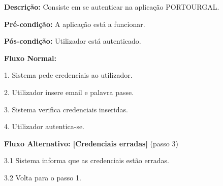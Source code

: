 \textbf{Descrição:}  Consiste em se autenticar na aplicação PORTOURGAL.

\textbf{Pré-condição:} A aplicação está a funcionar.

\textbf{Pós-condição:} Utilizador está autenticado.

\textbf{Fluxo Normal:}

1. Sistema pede credenciais ao utilizador.

2. Utilizador insere email e palavra passe.

3. Sistema verifica credenciais inseridas.

4. Utilizador autentica-se.

\textbf{Fluxo Alternativo: [Credenciais erradas]} (passo 3)

3.1 Sistema informa que as credenciais estão erradas.

3.2 Volta para o passo 1.